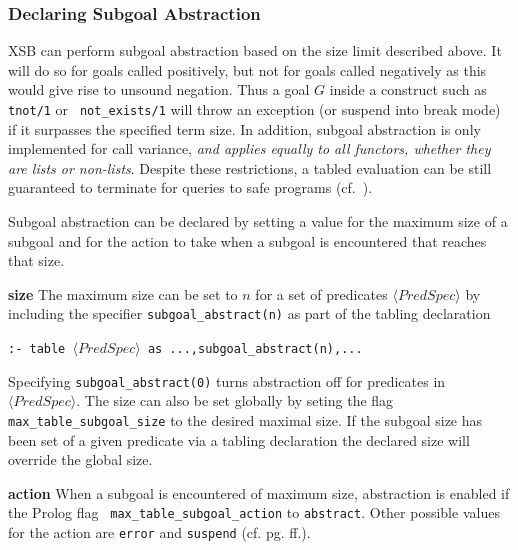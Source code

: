 \subsubsection{Declaring Subgoal Abstraction}
%

XSB can perform subgoal abstraction based on the size limit described
above.  It will do so for goals called positively, but not for goals
called negatively as this would give rise to unsound negation.  Thus a
goal $G$ inside a construct such as {\tt tnot/1} or {\tt
  not\_exists/1} will throw an exception (or suspend into break mode)
if it surpasses the specified term size. In addition, subgoal
abstraction is only implemented for call variance, {\em and applies
  equally to all functors, whether they are lists or non-lists}.
Despite these restrictions, a tabled evaluation can be still
guaranteed to terminate for queries to safe programs
(cf.~\cite{RigS13}).


Subgoal abstraction can be declared by setting a value for the maximum
size of a subgoal and for the action to take when a subgoal is
encountered that reaches that size.
%
\bi
\item {\bf size} The maximum size can be set to $n$ for a set of
  predicates $\langle PredSpec \rangle$ by including the specifier
  {\tt subgoal\_abstract(n)} as part of the tabling declaration

{\tt :- table $\langle PredSpec\rangle$  as ...,subgoal\_abstract(n),...}

  Specifying {\tt subgoal\_abstract(0)} turns abstraction off for
  predicates in $\langle PredSpec \rangle$.  The size can also be set
  globally by seting the flag {\tt max\_table\_subgoal\_size} to the
  desired maximal size.  If the subgoal size has been set of a given
  predicate via a tabling declaration the declared size will override
  the global size.

\item {\bf action} When a subgoal is encountered of maximum size,
  abstraction is enabled if the Prolog flag {\tt
    max\_table\_subgoal\_action} to {\tt abstract}.  Other possible
  values for the action are {\tt error} and {\tt suspend}
  (cf. pg. \pageref{prolog-flags} ff.).  \ei

